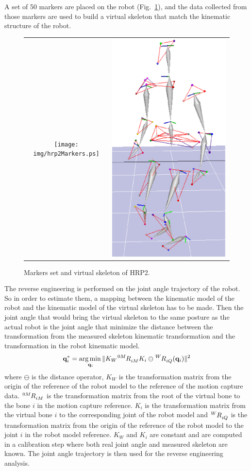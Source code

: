 \documentclass[letterpaper, 10pt, conference]{ieeeconf}      %
\begin{document}
A set of 50 markers
are placed on the robot (Fig.~\ref{fig:hrp2Markers}), and the data collected from those markers
are used to build a virtual skeleton that match the kinematic structure of the robot.
\begin{figure}[t]
  \centering
  \begin{tabular}{cc}
    \texttt{[image: img/hrp2Markers.ps]} &
    \includegraphics[height=0.7\linewidth]{img/skel.ps} \\
  \end{tabular}
  \caption{Markers set and virtual skeleton of HRP2.}
  \label{fig:hrp2Markers}
\end{figure}

The reverse engineering is performed on the joint angle trajectory of the robot.
So in order to estimate them, a mapping between
the kinematic model of the robot and the kinematic model of the virtual skeleton
has to be made. Then the joint angle that would bring the virtual skeleton to the same posture
as the actual robot is the joint angle that minimize the distance between
the transformation from the measured skeleton kinematic transformation and the transformation in the robot kinematic model.
\begin{equation}
  \mbf{q}^*_i = \underset{\mbf{q}_i}\argmin \Vert K_W\tensor[^{0M}]{R}{_{iM}}K_i \ominus \tensor[^W]{R}{_{iQ}}(\mbf{q}_i) \Vert ^2\\
  \label{mocapOpti}
\end{equation}
where $\ominus$ is the distance operator, $K_W$ is the transformation matrix from the origin of the reference of the robot model to the reference of the 
motion capture data. $\tensor[^{0M}]{R}{_{iM}}$ is the transformation matrix from the root of the virtual bone to
the bone $i$ in the motion capture reference. $K_i$ is the transformation matrix from the virtual bone $i$ to
the corresponding joint of the robot model and $\tensor[^W]{R}{_{iQ}}$ is the transformation matrix from 
the origin of the reference of the robot model to the joint $i$ in the robot model reference.
$K_W$ and $K_i$ are constant and are computed in a calibration step where both real joint angle and
measured skeleton are known. The joint angle trajectory is then used for the reverse engineering analysis.\\
\end{document}
